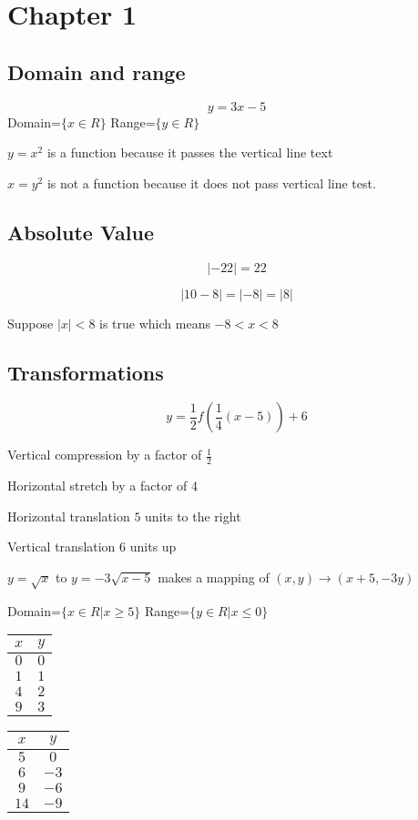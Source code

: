 \documentclass[../main.tex]{subfiles}
\begin{document}
\section{Chapter 1}
\subsection{Domain and range}
$$y=3x-5$$
Domain=$\{x\in\!R\}$
Range=$\{y\in\!R\}$

$y=x^2$ is a function because it passes the vertical line text

\noindent$x=y^2$ is not a function because it does not pass vertical line test.

\subsection{Absolute Value}

$$|-22|=22$$

$$|10-8|=|-8|=|8|$$

Suppose $|x|<8$ is true which means $-8<x<8$

\subsection{Transformations}

$$y=\frac{1}{2}f(\frac{1}{4}(x-5))+6$$

Vertical compression by a factor of $\frac{1}{2}$

Horizontal stretch by a factor of $4$

Horizontal translation $5$ units to the right

Vertical translation $6$ units up

$y=\sqrt{x}$ to $y=-3\sqrt{x-5}$ makes a mapping of $(x,y)\rightarrow(x+5,-3y)$

Domain=$\{x\in\!R|x\ge5\}$
Range=$\{y\in\!R|x\le0\}$

\begin{tabular}{c|c}
    $x$&$y$\\
    \hline
    $0$&$0$\\
    $1$&$1$\\
    $4$&$2$\\
    $9$&$3$\\
\end{tabular}
\quad
\begin{tabular}{c|c}
    $x$&$y$\\
    \hline
    $5$&$0$\\
    $6$&$-3$\\
    $9$&$-6$\\
    $14$&$-9$\\
\end{tabular}
\end{document}

